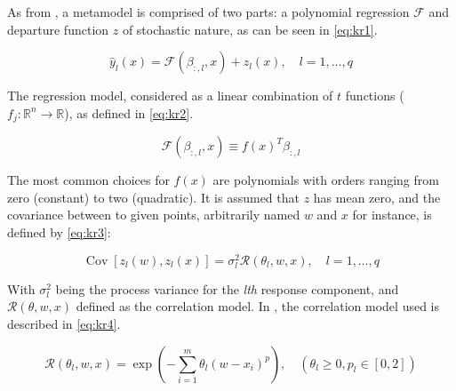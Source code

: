 \documentclass[../msc-thesis.tex]{subfiles}
\begin{document}
As from \textcite{Lophaven2002}, a \kriging metamodel is comprised of two 
parts: a polynomial regression $\mathcal{F}$ and departure function $z$ of 
stochastic nature, as can be seen in \autoref{eq:kr1}.

\begin{equation}
    \hat{y}_{l}(x)=\mathcal{F}\left(\beta_{:, l}, x\right)+z_{l}(x), 
    \quad l=1, \ldots, q
    \label{eq:kr1}
\end{equation}

The regression model, considered as a linear combination of $t$ functions 
($f_{j}: \mathbb{R}^{n} \rightarrow \mathbb{R}$), as defined in 
\autoref{eq:kr2}.

\begin{equation}
	\mathcal{F}\left(\beta_{:, l}, x\right) \equiv f(x)^{T} \beta_{:, l}
	\label{eq:kr2}
\end{equation}

The most common choices for $f(x)$ are polynomials with orders ranging from 
zero (constant) to two (quadratic). It is assumed that $z$ has mean zero, and 
the covariance between to given points, arbitrarily named $w$ and $x$ for 
instance, is defined by \autoref{eq:kr3}:

\begin{equation}
    \operatorname{Cov}\left[z_{l}(w), z_{l}(x)\right]=\sigma_{l}^{2} 
    \mathcal{R}\left(\theta_{l}, w, x\right), \quad l=1, \ldots, q
	\label{eq:kr3}
\end{equation}

With $\sigma_{l}^{2}$ being the process variance for the \textit{lth} response 
component, and $\mathcal{R}(\theta, w, x)$ defined as the correlation model. 
In \mtc, the correlation model used is described in \autoref{eq:kr4}.

\begin{equation}
    \mathcal{R}\left(\theta_{l}, w, x\right)=\exp \left(-\sum_{i=1}^{m} 
    \theta_{l}\left(w-x_{i}\right)^{p}\right), \quad\left(\theta_{l} \geq 0, 
    p_{l} \in[0,2]\right)
	\label{eq:kr4}
\end{equation}
\end{document}
